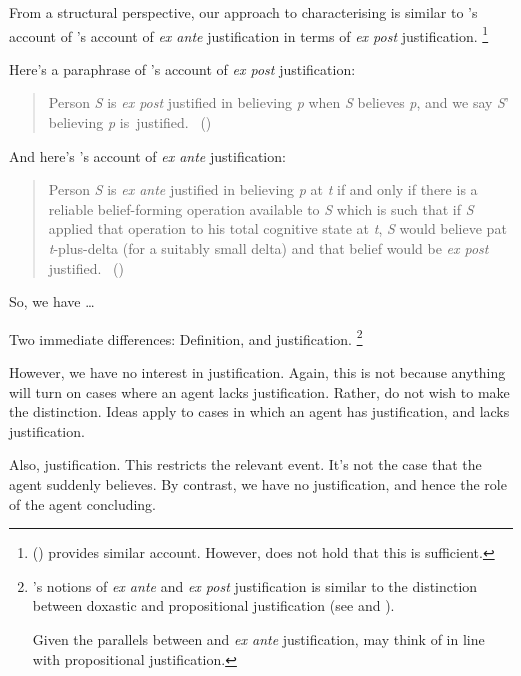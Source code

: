 \begin{note}
  From a structural perspective, our approach to characterising  is similar to \citeauthor{Goldman:1979ui}'s account of \citeauthor{Goldman:1979ui}'s account of \emph{ex ante} justification in terms of \emph{ex post} justification.%
  \footnote{
    \citeauthor{Turri:2010aa} (\citeyear{Turri:2010aa}) provides similar account.
    However, \citeauthor{Turri:2010aa} does not hold that this is sufficient.
  }

  Here's a paraphrase of \citeauthor{Goldman:1979ui}'s account of \emph{ex post} justification:
  \begin{quote}
    Person \emph{S} is \emph{ex post} justified in believing \emph{p} when \emph{S} believes \emph{p}, and we say \emph{S}' believing \emph{p} is~justified.%
    \mbox{ }\hfill\mbox{(\citeyear[Cf.][21]{Goldman:1979ui})}
  \end{quote}
  And here's \citeauthor{Goldman:1979ui}'s account of \emph{ex ante} justification:
  \begin{quote}
    Person \emph{S} is \emph{ex ante} justified in believing \emph{p} at \emph{t} if and only if there is a reliable belief-forming operation available to \emph{S} which is such that if \emph{S} applied that operation to his total cognitive state at \emph{t}, \emph{S} would believe pat \emph{t}-plus-delta (for a suitably small delta) and that belief would be \emph{ex post} justified.%
    \mbox{ }\hfill\mbox{(\citeyear[21]{Goldman:1979ui})}
  \end{quote}
  So, we have \dots

  Two immediate differences: Definition, and justification.%
  \footnote{
    \citeauthor{Goldman:1979ui}'s notions of \emph{ex ante} and \emph{ex post} justification is similar to the distinction between doxastic and propositional justification (see \cite{Firth:1978vi} and \cite[esp.\ fn.1]{Silva:2020aa}).

    Given the parallels between  and \emph{ex ante} justification, may think of  in line with propositional justification.
  }

  However, we have no interest in justification.
  Again, this is not because anything will turn on cases where an agent lacks justification.
  Rather, do not wish to make the distinction.
  Ideas apply to cases in which an agent has justification, and lacks justification.

  {
    \color{red}
    Also, justification.
    This restricts the relevant event.
    It's not the case that the agent suddenly believes.
    By contrast, we have no justification, and hence the role of the agent concluding.
  }
\end{note}



